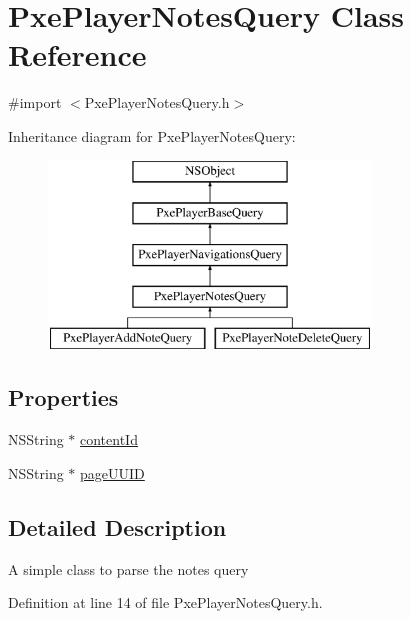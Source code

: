 \hypertarget{interface_pxe_player_notes_query}{\section{Pxe\-Player\-Notes\-Query Class Reference}
\label{interface_pxe_player_notes_query}
}


{\ttfamily \#import $<$Pxe\-Player\-Notes\-Query.\-h$>$}

Inheritance diagram for Pxe\-Player\-Notes\-Query\-:\begin{figure}[H]
\begin{center}
\leavevmode
\includegraphics[height=5.000000cm]{interface_pxe_player_notes_query}
\end{center}
\end{figure}
\subsection*{Properties}
\begin{DoxyCompactItemize}
\item 
N\-S\-String $\ast$ \hyperlink{interface_pxe_player_notes_query_a66597b0335428b0dc9c3c1fef4ad3fee}{content\-Id}
\item 
N\-S\-String $\ast$ \hyperlink{interface_pxe_player_notes_query_a4e8cb70602c3cf22f44a258f925763f0}{page\-U\-U\-I\-D}
\end{DoxyCompactItemize}


\subsection{Detailed Description}
A simple class to parse the notes query 

Definition at line 14 of file Pxe\-Player\-Notes\-Query.\-h.



